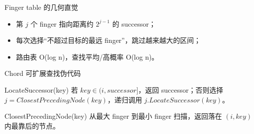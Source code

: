 \documentclass[UTF8,fontset=none,aspectratio=169,10pt]{beamer}
\begin{document}
\begin{frame}{Finger table 的几何直觉}
\begin{center}
\end{center}
\begin{itemize}
  \item 第 $j$ 个 finger 指向距离约 $2^{j-1}$ 的 successor；
  \item 每次选择“不超过目标的最远 finger”，跳过越来越大的区间；
  \item 路由表 O(log n)，查找平均/高概率 O(log n)。
\end{itemize}
\end{frame}

\begin{frame}{Chord 可扩展查找伪代码}
\begin{block}{LocateSuccessor(key)}
若 $key\in(i,successor]$，返回 successor；否则选择 $j=ClosestPrecedingNode(key)$，递归调用 $j.LocateSuccessor(key)$。
\end{block}
\begin{block}{ClosestPrecedingNode(key)}
从最大 finger 到最小 finger 扫描，返回落在 $(i,key)$ 内最靠后的节点。
\end{block}
\vfill
{}
\end{frame}
\end{document}
